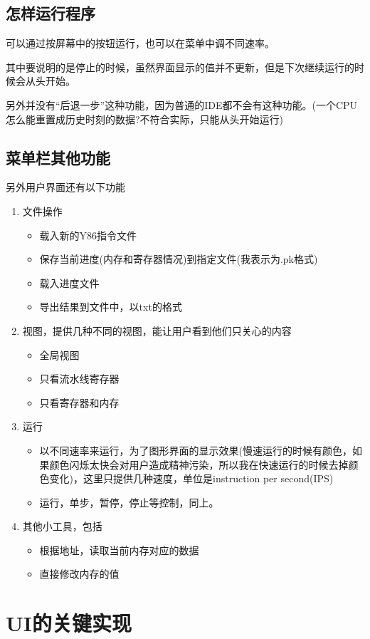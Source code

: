 \documentclass{article}
\begin{document}
\subsection{怎样运行程序}
可以通过按屏幕中的按钮运行，也可以在菜单中调不同速率。

其中要说明的是停止的时候，虽然界面显示的值并不更新，但是下次继续运行的时候会从头开始。

另外并没有“后退一步”这种功能，因为普通的IDE都不会有这种功能。(一个CPU怎么能重置成历史时刻的数据?不符合实际，只能从头开始运行)
\subsection{菜单栏其他功能}
另外用户界面还有以下功能
\begin{enumerate}
\item 文件操作
\begin{itemize}
	\item 载入新的Y86指令文件
	\item 保存当前进度(内存和寄存器情况)到指定文件(我表示为.pk格式)
	\item 载入进度文件
	\item 导出结果到文件中，以txt的格式
\end{itemize}
\item 视图，提供几种不同的视图，能让用户看到他们只关心的内容
\begin{itemize}
	\item 全局视图
	\item 只看流水线寄存器
	\item 只看寄存器和内存
\end{itemize}
\item 运行
\begin{itemize}
	\item 以不同速率来运行，为了图形界面的显示效果(慢速运行的时候有颜色，如果颜色闪烁太快会对用户造成精神污染，所以我在快速运行的时候去掉颜色变化)，这里只提供几种速度，单位是instruction per second(IPS)
	\item 运行，单步，暂停，停止等控制，同上。
\end{itemize}
\item 其他小工具，包括
\begin{itemize}
	\item 根据地址，读取当前内存对应的数据
	\item 直接修改内存的值
\end{itemize}
\end{enumerate}
\section{UI的关键实现}
\end{document}
